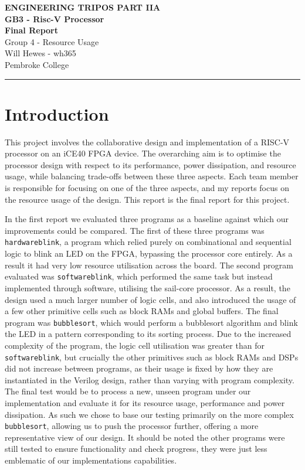 \documentclass[a4paper,10pt]{article}
\renewcommand{\maketitle}{
    \begin{center}
        \LARGE \textbf{ENGINEERING TRIPOS PART IIA} \\ 
        \vspace{0.5em}
        \Large \textbf{GB3 - Risc-V Processor} \\ 
        \vspace{0.5em}
        \textbf{Final Report} \\
        \large Group 4 - Resource Usage \\
        \vspace{1em}
        \large Will Hewes - wh365 \\ 
        Pembroke College \\ 
        \vspace{0.5em}
    \end{center}
}
\begin{document}

\maketitle
\hrule
\tableofcontents
\newpage
{} \setcounter{page}{1}

\section{Introduction}
\label{sec:Introduction}

This project involves the collaborative design and implementation 
of a RISC-V processor on an iCE40 FPGA device. 
The overarching aim is to optimise 
the processor design with respect to its 
performance, power dissipation, and resource usage, 
while balancing trade-offs between these three aspects. 
Each team member is responsible for focusing on one of the three aspects,
and my reports focus on the resource usage of the design.
This report is the final report for this project.

In the first report we evaluated three programs as a baseline against
which our improvements could be compared.
The first of these three programs was \texttt{hardwareblink},
a program which relied purely on combinational and sequential logic
to blink an LED on the FPGA,
bypassing the processor core entirely. 
As a result it had very low resource utilisation across the board.
The second program evaluated was \texttt{softwareblink},
which performed the same task but instead implemented through software,
utilising the sail-core processor.
As a result, the design used a much larger number of logic cells,
and also introduced the usage of a few other primitive cells such as 
block RAMs and global buffers.
The final program was \texttt{bubblesort}, which would perform a 
bubblesort algorithm and blink the LED in a pattern
corresponding to its sorting process.
Due to the increased complexity of the program,
the logic cell utilisation was greater than for \texttt{softwareblink},
but crucially the other primitives such as 
block RAMs and DSPs did not increase between programs,
as their usage is fixed by how they are instantiated in the Verilog design, 
rather than varying with program complexity.
The final test would be to process 
a new, unseen program under our implementation and evaluate it for its 
resource usage, performance and power dissipation.
As such we chose to base our testing primarily 
on the more complex \texttt{bubblesort},
allowing us to push the processor further,
offering a more representative view of our design.
It should be noted the other programs were still tested
to ensure functionality and check progress,
they were just less emblematic of our implementations capabilities.
\end{document}
